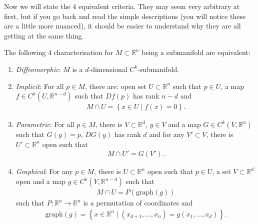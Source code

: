 Now we will state the 4 equivalent criteria. They may seem very arbitrary at first, but if you go back and read the simple descriptions (you will notice these are a little more nuanced), it should be easier to understand why they are all getting at the same thing.

\begin{prop}\label{prop:char-manifold}
	The following $4$ characterisation for $M \subset \mathbb{R}^{n}$ being a submanifold are equivalent:
	\begin{enumerate}
		\item \textit{Diffeomorphic}: $M$ is a $d$-dimensional $C^{k}$-submanifold.
		\item \textit{Implicit}: For all $p \in M$, there are: open set $U \subset \mathbb{R}^{n}$ such that $p \in U$, a map $f \in C^{k}(U, \mathbb{R}^{n-d})$ such that $Df(p)$ has rank $n-d$ and
		      \begin{align*}
			      M \cap U = \left\{ x \in U \mid f(x) = 0 \right\}.
		      \end{align*}
		\item \textit{Parametric}: For all $p \in M$, there is $V \subset \mathbb{R}^{d}$, $y \in V$ and a map $G \in C^{k}(V, \mathbb{R}^{n})$ such that $G(y) = p$, $DG(y)$ has rank $d$ and for any $V' \subset V$, there is $U' \subset \mathbb{R}^{n}$ open such that
		      \begin{align*}
			      M \cap U' = G(V').
		      \end{align*}
		\item \textit{Graphical}: For any $p \in M$, there is $U \subset \mathbb{R}^{n}$ open such that $p \in U$, a set $V \subset \mathbb{R}^{d}$ open and a map $g \in C^{k}(V, \mathbb{R}^{n-d})$ such that
		      \begin{align*}
			      M \cap U = P(\text{graph}(g))
		      \end{align*}
		      such that $P: \mathbb{R}^{n} \to \mathbb{R}^{n}$ is a permutation of coordinates and
		      \begin{align*}
			      \text{graph}(g) = \left\{ x \in \mathbb{R}^{n} \mid (x_{d+1}, \dots, x_{n}) = g(x_{1}, \dots, x_{d}) \right\}.
		      \end{align*}
	\end{enumerate}
\end{prop}
